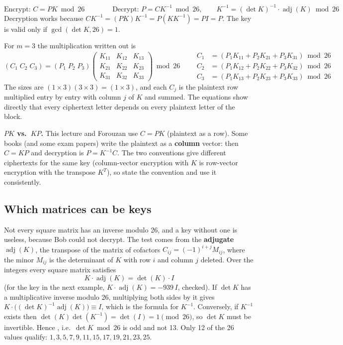 \begin{mustknow}
\vspace{-6pt}
\[
\text{Encrypt: } C = PK \bmod 26 \qquad\qquad \text{Decrypt: } P = CK^{-1} \bmod 26, \qquad K^{-1} = (\det K)^{-1} \cdot \operatorname{adj}(K) \bmod 26
\]
Decryption works because $CK^{-1} = (PK)K^{-1} = P(KK^{-1}) = PI = P$. The key is valid only if $\gcd(\det K, 26) = 1$.
\end{mustknow}

For $m = 3$ the multiplication written out is
\[
(C_1\;C_2\;C_3) = (P_1\;P_2\;P_3)\begin{pmatrix}K_{11}&K_{12}&K_{13}\\K_{21}&K_{22}&K_{23}\\K_{31}&K_{32}&K_{33}\end{pmatrix} \bmod 26
\qquad
\begin{aligned}
C_1 &= (P_1K_{11}+P_2K_{21}+P_3K_{31}) \bmod 26\\
C_2 &= (P_1K_{12}+P_2K_{22}+P_3K_{32}) \bmod 26\\
C_3 &= (P_1K_{13}+P_2K_{23}+P_3K_{33}) \bmod 26
\end{aligned}
\]
The sizes are $(1\times3)(3\times3) = (1\times3)$, and each $C_j$ is the plaintext row multiplied entry by entry with column $j$ of $K$ and summed. The equations show directly that every ciphertext letter depends on every plaintext letter of the block.

\textbf{$PK$ vs.\ $KP$.} This lecture and Forouzan use $C = PK$ (plaintext as a row). Some books (and some exam papers) write the plaintext as a \textbf{column} vector: then $C = KP$ and decryption is $P = K^{-1}C$. The two conventions give different ciphertexts for the same key (column-vector encryption with $K$ is row-vector encryption with the transpose $K^T$), so state the convention and use it consistently.

\subsection{Which matrices can be keys}
Not every square matrix has an inverse modulo 26, and a key without one is useless, because Bob could not decrypt. The test comes from the \textbf{adjugate} $\operatorname{adj}(K)$, the transpose of the matrix of cofactors $C_{ij} = (-1)^{i+j} M_{ij}$, where the minor $M_{ij}$ is the determinant of $K$ with row $i$ and column $j$ deleted. Over the integers every square matrix satisfies
\[
K \cdot \operatorname{adj}(K) = \det(K) \cdot I
\]
(for the key in the next example, $K \cdot \operatorname{adj}(K) = -939\, I$, checked). If $\det K$ has a multiplicative inverse modulo 26, multiplying both sides by it gives $K \cdot \big((\det K)^{-1}\operatorname{adj}(K)\big) \equiv I$, which is the formula for $K^{-1}$. Conversely, if $K^{-1}$ exists then $\det(K)\det(K^{-1}) = \det(I) = 1 \pmod{26}$, so $\det K$ must be invertible. Hence , i.e.\ $\det K \bmod 26$ is odd and not 13. Only 12 of the 26 values qualify: $1, 3, 5, 7, 9, 11, 15, 17, 19, 21, 23, 25$.

